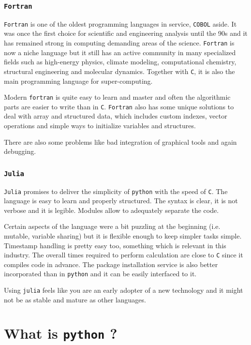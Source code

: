 \subsubsection{\texttt{Fortran}}
\texttt{Fortran} is one of the oldest programming languages in service, \texttt{COBOL} aside. It was once the first choice for scientific and engineering analysis until the 90s and it has remained strong in computing demanding areas of the science.
\texttt{Fortran} is now a niche language but it still has an active community in many specialized fields such as high-energy physics, climate modeling, computational chemistry, structural engineering and molecular dynamics. Together with \texttt{C}, it is also the main programming language for super-computing. 

Modern \texttt{fortran} is quite easy to learn and master and often the algorithmic parts are easier to write than in \texttt{C}. \texttt{Fortran} also has some unique solutions to deal with array and structured data, which includes custom indexes, vector operations and simple ways to initialize variables and structures.

There are also some problems like bad integration of graphical tools and again debugging.  

\subsubsection{\texttt{Julia}}
\texttt{Julia} promises to deliver the simplicity of \texttt{python} with the speed of \texttt{C}.
The language is easy to learn and properly structured. The syntax is clear, it is not verbose and it is legible. Modules allow to adequately separate the code.

Certain aspects of the language were a bit puzzling at the beginning (i.e. mutable, variable sharing) but it is flexible enough to keep simpler tasks simple. Timestamp handling is pretty easy too, something which is relevant in this industry.
The overall times required to perform calculation are close to \texttt{C} since it compiles code in advance. The package installation service is also better incorporated than in \texttt{python} and it can be easily interfaced to it.

Using \texttt{julia} feels like you are an early adopter of a new technology and it might not be as stable and mature as other languages.

\section{What is \texttt{python} ?}
\label{what-is-python}

